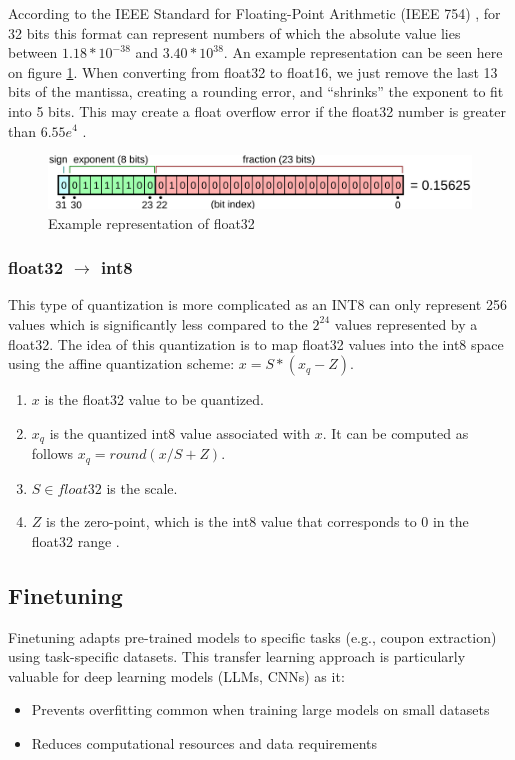 \documentclass[licencjacka,en]{pracamgr}
\begin{document}
According to the IEEE Standard for Floating-Point Arithmetic (IEEE 754) \cite{IEEE754}, for 32 bits this format can represent numbers of which the absolute value lies between $1.18 * 10^{-38}$ and $3.40 * 10^{38}$. An example representation can be seen here on figure \ref{fig:float}.
When converting from float32 to float16, we just remove the last 13 bits of the mantissa, creating a rounding error, and “shrinks” the exponent to fit into 5 bits. This may create a float overflow error if the float32 number is greater than $ 6.55e^4$ \cite{quant_explained}. 

\begin{figure}
    \centering
    \includegraphics[width=1.0\linewidth]{bachelor_images/mantis.png}
    \caption{Example representation of float32 \cite{IEEE754}}
    \label{fig:float}
\end{figure}

\subsubsection{float32 $\rightarrow$ int8}
This type of quantization is more complicated as an INT8 can only represent 256 values which is significantly less compared to the $ 2^{24} $  values represented by a float32. The idea of this quantization is to map float32 values into the int8 space using the affine quantization scheme: $ x = S * (x_q - Z) $. 
\begin{enumerate}
	\item $ x $ is the float32 value to be quantized.
	\item  $ x_q $ is the quantized int8 value associated with $ x $. It can be computed as follows $ x_q = round(x/S + Z) $.	
	\item $ S \in float32$ is the scale.
	\item $ Z $ is the zero-point, which is the int8 value that corresponds to 0 in the float32 range \cite{quant_hf}.
\end{enumerate}

\subsection{Finetuning}
Finetuning adapts pre-trained models to specific tasks (e.g., coupon extraction) using task-specific datasets. This transfer learning approach is particularly valuable for deep learning models (LLMs, CNNs) as it:
\begin{itemize}
    \item Prevents overfitting common when training large models on small datasets
    \item Reduces computational resources and data requirements \cite{ibm_finetuning}
\end{itemize}
\end{document}
